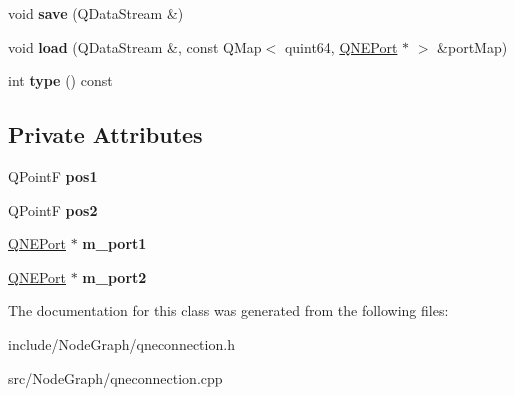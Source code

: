\begin{DoxyCompactItemize}
\item 
\hypertarget{class_q_n_e_connection_a464c441d1c9074d81916fbaf6e7a6408}{void {\bfseries save} (Q\-Data\-Stream \&)}\label{class_q_n_e_connection_a464c441d1c9074d81916fbaf6e7a6408}

\item 
\hypertarget{class_q_n_e_connection_a06b01eb3a17238308e489781b271cc2e}{void {\bfseries load} (Q\-Data\-Stream \&, const Q\-Map$<$ quint64, \hyperlink{class_q_n_e_port}{Q\-N\-E\-Port} $\ast$ $>$ \&port\-Map)}\label{class_q_n_e_connection_a06b01eb3a17238308e489781b271cc2e}

\item 
\hypertarget{class_q_n_e_connection_a207b37cc0587e43a5fbdd90ce838921f}{int {\bfseries type} () const }\label{class_q_n_e_connection_a207b37cc0587e43a5fbdd90ce838921f}

\end{DoxyCompactItemize}
\subsection*{Private Attributes}
\begin{DoxyCompactItemize}
\item 
\hypertarget{class_q_n_e_connection_a787f13c53870b9cf0eba9bcc313d6851}{Q\-Point\-F {\bfseries pos1}}\label{class_q_n_e_connection_a787f13c53870b9cf0eba9bcc313d6851}

\item 
\hypertarget{class_q_n_e_connection_a27d068bac8220e31d339537e2c27512d}{Q\-Point\-F {\bfseries pos2}}\label{class_q_n_e_connection_a27d068bac8220e31d339537e2c27512d}

\item 
\hypertarget{class_q_n_e_connection_a58e8bf6d65c9ded23a13d0ff261b453c}{\hyperlink{class_q_n_e_port}{Q\-N\-E\-Port} $\ast$ {\bfseries m\-\_\-port1}}\label{class_q_n_e_connection_a58e8bf6d65c9ded23a13d0ff261b453c}

\item 
\hypertarget{class_q_n_e_connection_a7133385034cf2bc2376c2ed81c5dff2a}{\hyperlink{class_q_n_e_port}{Q\-N\-E\-Port} $\ast$ {\bfseries m\-\_\-port2}}\label{class_q_n_e_connection_a7133385034cf2bc2376c2ed81c5dff2a}

\end{DoxyCompactItemize}


The documentation for this class was generated from the following files\-:\begin{DoxyCompactItemize}
\item 
include/\-Node\-Graph/qneconnection.\-h\item 
src/\-Node\-Graph/qneconnection.\-cpp\end{DoxyCompactItemize}
